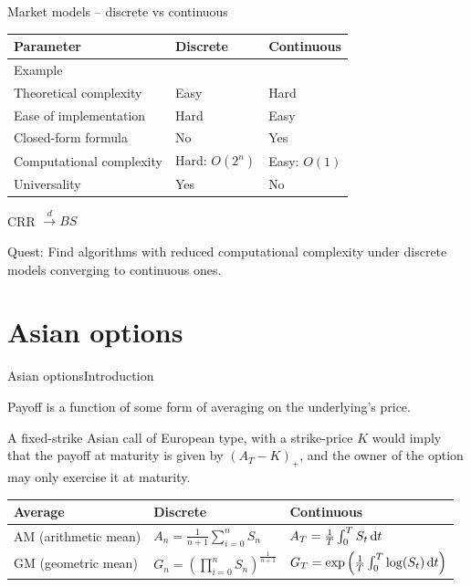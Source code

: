 \documentclass[utf8,t,xcolor=svgnames]{beamer}
\begin{document}
\begin{frame}{Market models -- discrete vs continuous}
	\begin{tabular}{lll}
		\toprule
		Parameter  &  Discrete  &  Continuous  \\
		\midrule
		Example  &  \cite{Cox1979}  &  \cite{Black1973}  \\
		Theoretical complexity  &  Easy  &  Hard  \\
		Ease of implementation  &  Hard  &  Easy  \\
		Closed-form formula  &  No\footnotemark  &  Yes  \\
		Computational complexity  &  Hard: $ O(2^n) $\footnotemark[1]  &  Easy: $ O(1) $  \\
		Universality  &  Yes  &  No  \\
		\bottomrule
	\end{tabular}
	
	\begin{theorem}
		CRR $ \xrightarrow{d} BS $
	\end{theorem}
	
	\alert{Quest}: Find algorithms with reduced computational complexity under discrete models converging to continuous ones.
\end{frame}

\section{Asian options}

\begin{frame}{Asian options}{Introduction}
	\begin{definition}
		Payoff is a function of some form of averaging on the underlying's price.
	\end{definition}
	
	\begin{example}
		A fixed-strike Asian call of European type, with a strike-price $ K $ would imply that the payoff at maturity is given by $ (A_T - K)_+ $, and the owner of the option may only exercise it at maturity.
	\end{example}
	
	\begin{tabular}{lll}
		\toprule
		Average  &  Discrete  &  Continuous  \\
		\midrule
		AM (arithmetic mean)  &  $ A_n = \frac{1}{n+1} \sum_{i=0}^{n} S_n $  &  $ A_T = \frac{1}{T} \int_{0}^{T} S_t \dif t $  \\
		GM (geometric mean)  &  $ G_n = \left( \prod_{i=0}^{n} S_n \right)^{\frac{1}{n+1}} $  &  $  
		G_T = \exp \left(  \frac{1}{T} \int_{0}^{T} \log(S_t) \dif t  \right) $  \\
		\bottomrule
	\end{tabular}
	
\end{frame}
\end{document}
